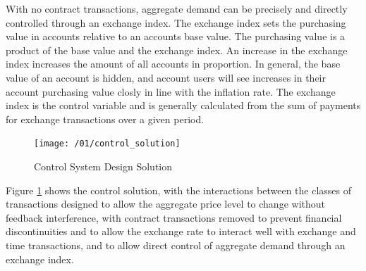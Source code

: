 With no contract transactions, aggregate demand can be precisely and directly controlled through an
exchange index.  The exchange index sets the purchasing value in accounts relative to an accounts
base value. The purchasing value is a product of the base value and the exchange index. An increase
in the exchange index increases the amount of all accounts in proportion. In general, the base value
of an account is hidden, and account users will see increases in their account purchasing value
closly in line with the inflation rate. The exchange index is the control variable and is generally
calculated from the sum of payments for exchange transactions over a given period.  

\begin{figure}[H]
\centering
\texttt{[image: /01/control\_solution]}
\caption{Control System Design Solution}
\label{fig:control_solution}
\end{figure}

Figure \ref{fig:control_solution} shows the control solution, with the interactions between the
classes of transactions designed to allow the aggregate price level to change without feedback
interference, with contract transactions removed to prevent financial discontinuities and to allow
the exchange rate to interact well with exchange and time transactions, and to allow direct control
of aggregate demand through an exchange index.
